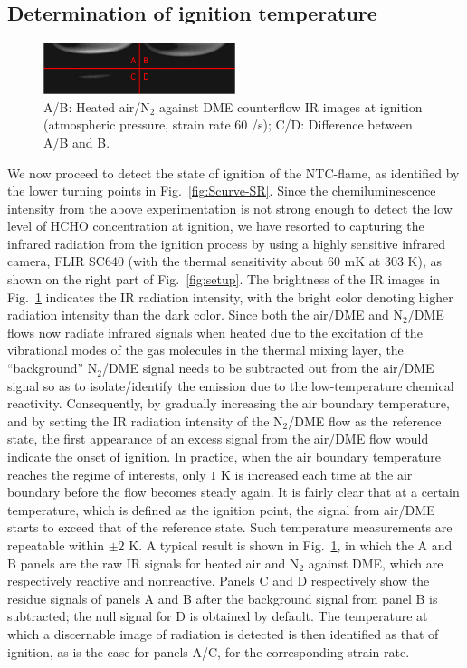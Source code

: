 \documentclass[review,3p,times]{elsarticleUS}
\begin{document}
\subsection{Determination of ignition temperature} \label{sec:4.2}

\begin{figure}[ht]
  \centering
  \scriptsize
  \vspace{0.1in}
  \includegraphics[width=0.5\textwidth]{IR.png}
  \normalsize
  \caption{A/B: Heated air/N$_2$ against DME counterflow IR images at ignition (atmospheric pressure, strain rate $60$ /s); C/D: Difference between A/B and B.}
  \label{fig:IR}
\end{figure}

We now proceed to detect the state of ignition of the NTC-flame, as identified by the lower turning points in Fig.~\ref{fig:Scurve-SR}.  Since the chemiluminescence intensity from the above experimentation is not strong enough to detect the low level of HCHO concentration at ignition, we have resorted to capturing the infrared radiation from the ignition process by using a highly sensitive infrared camera, FLIR SC640 (with the thermal sensitivity about $60$ mK at $303$ K), as shown on the right part of Fig.~\ref{fig:setup}.  The brightness of the IR images in Fig.~\ref{fig:IR} indicates the IR radiation intensity, with the bright color denoting higher radiation intensity than the dark color.  Since both the air/DME and N$_2$/DME flows now radiate infrared signals when heated due to the excitation of the vibrational modes of the gas molecules in the thermal mixing layer, the “background” N$_2$/DME signal needs to be subtracted out from the air/DME signal so as to isolate/identify the emission due to the low-temperature chemical reactivity.  Consequently, by gradually increasing the air boundary temperature, and by setting the IR radiation intensity of the N$_2$/DME flow as the reference state, the first appearance of an excess signal from the air/DME flow would indicate the onset of ignition.  In practice, when the air boundary temperature reaches the regime of interests, only $1$ K is increased each time at the air boundary before the flow becomes steady again.  It is fairly clear that at a certain temperature, which is defined as the ignition point, the signal from air/DME starts to exceed that of the reference state.  Such temperature measurements are repeatable within $\pm 2$ K.  A typical result is shown in Fig.~\ref{fig:IR}, in which the A and B panels are the raw IR signals for heated air and N$_2$ against DME, which are respectively reactive and nonreactive.  Panels C and D respectively show the residue signals of panels A and B after the background signal from panel B is subtracted; the null signal for D is obtained by default.  The temperature at which a discernable image of radiation is detected is then identified as that of ignition, as is the case for panels A/C, for the corresponding strain rate.
\end{document}
